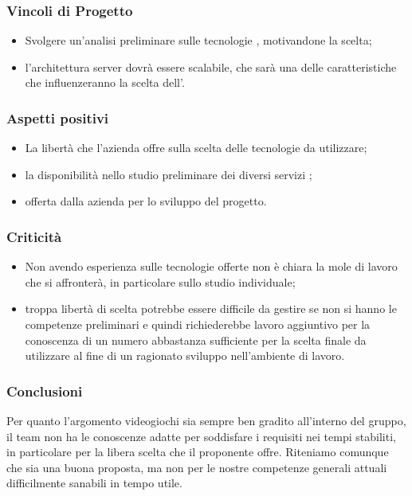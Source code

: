 \documentclass[]{article}
\begin{document}
		\subsubsection{Vincoli di Progetto}
		\begin{itemize}
			\item Svolgere un'analisi preliminare sulle tecnologie , motivandone la scelta;
			\item l'architettura server dovrà essere scalabile, che sarà una delle caratteristiche che influenzeranno la scelta dell'.
		\end{itemize}

		\subsubsection{Aspetti positivi}
		\begin{itemize}
			\item La libertà che l'azienda offre sulla scelta delle tecnologie da utilizzare;
			\item la disponibilità nello studio preliminare dei diversi servizi ;
			\item {}  offerta dalla azienda per lo sviluppo del progetto.
		\end{itemize}

		\subsubsection{Criticità}
		\begin{itemize}
			\item Non avendo esperienza sulle tecnologie offerte non è chiara la mole di lavoro che si affronterà, in particolare sullo studio individuale;
			\item troppa libertà di scelta potrebbe essere difficile da gestire se non si hanno le competenze preliminari e quindi richiederebbe lavoro aggiuntivo per la conoscenza di un numero abbastanza sufficiente per la scelta finale da utilizzare al fine di un ragionato sviluppo nell'ambiente di lavoro.
		\end{itemize}

		\subsubsection{Conclusioni}
		Per quanto l'argomento videogiochi sia sempre ben gradito all'interno del gruppo, il team non ha le conoscenze adatte per soddisfare i requisiti nei tempi stabiliti, in particolare per la libera scelta che il proponente offre.
		Riteniamo comunque che sia una buona proposta, ma non per le nostre competenze generali attuali difficilmente sanabili in tempo utile.
\end{document}
